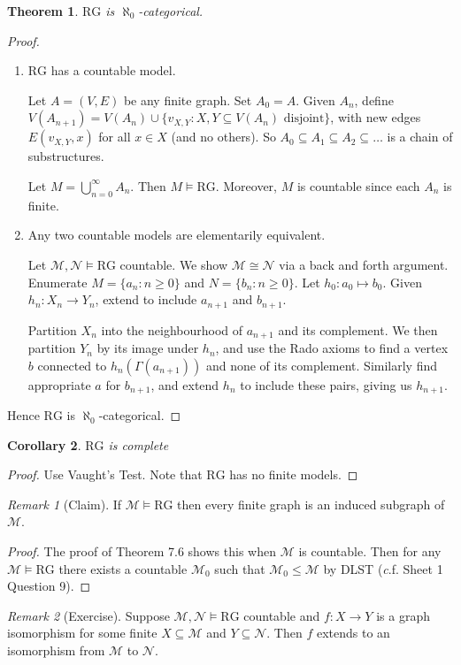 \documentclass[]{article}
\theoremstyle{custhm}
\newtheorem{theorem}{Theorem}[section]
\theoremstyle{cusdef}
\theoremstyle{custhm}
\theoremstyle{custhm}
\newtheorem{cor}[theorem]{Corollary}
\theoremstyle{custhm}
\theoremstyle{ex}
\theoremstyle{custhm}
\theoremstyle{cusdef}
\theoremstyle{remark}
\newtheorem*{remark*}{Remark}
\theoremstyle{remark}
\theoremstyle{numremark}
\newcommand{\ra}{\rightarrow}
\renewcommand{\it}[1]{\textit{#1}}
\newcommand{\M}{\mathcal{M}}
\newcommand{\N}{\mathcal{N}}
\newcommand{\rg}{\textrm{RG}}
\renewcommand{\subset}{\subseteq}
\begin{document}
\begin{theorem}
$\rg$ is $\aleph_0$-categorical.
\end{theorem}
\begin{proof}\ 
\begin{enumerate}[label=\arabic*)]
	\item $\rg$ has a countable model.
	
	Let $A = (V,E)$ be any finite graph. Set $A_0 = A$. Given $A_n$, define $V(A_{n+1}) = V(A_n)\cup\{v_{X,Y}:X,Y\subset V(A_n)\textrm{ disjoint}\}$, with new edges $E(v_{X,Y},x)$ for all $x\in X$ (and no others). So $A_0\subset A_1\subset A_2\subset\dots$ is a chain of substructures.
	
	Let $M = \bigcup_{n=0}^{\infty}A_n$. Then $M\models\rg$. Moreover, $M$ is countable since each $A_n$ is finite. 
	
	\item Any two countable models are elementarily equivalent.
	
	Let $\M,\N\models \rg$ countable. We show $\M\cong \N$ via a back and forth argument. Enumerate $M = \{a_n : n\ge 0\}$ and $N = \{b_n:n\ge 0\}$. Let $h_0: a_0\mapsto b_0$. Given $h_n:X_n\ra Y_n$, extend to include $a_{n+1}$ and $b_{n+1}$.
	
	Partition $X_n$ into the neighbourhood of $a_{n+1}$ and its complement. We then partition $Y_n$ by its image under $h_n$, and use the Rado axioms to find a vertex $b$ connected to $h_n(\Gamma(a_{n+1}))$ and none of its complement. Similarly find appropriate $a$ for $b_{n+1}$, and extend $h_n$ to include these pairs, giving us $h_{n+1}$.
\end{enumerate}
Hence $\rg$ is $\aleph_0$-categorical.
\end{proof}
\begin{cor}
$\rg$ is complete
\end{cor}
\begin{proof}
Use Vaught's Test. Note that $\rg$ has no finite models.
\end{proof}
\begin{remark*}[Claim]
If $\M\models \rg$ then every finite graph is an induced subgraph of $\M$.
\end{remark*}
\begin{proof}
The proof of Theorem 7.6 shows this when $\M$ is countable. Then for any $\M\models \rg$ there exists a countable $\M_0$ such that $\M_0\le \M$ by DLST ({\it c.f.} Sheet 1 Question 9).
\end{proof}
\begin{remark*}[Exercise]
	Suppose $\M,\N\models\rg$ countable and $f: X\ra Y$ is a graph isomorphism for some finite $X\subset \M$ and $Y\subset \N$. Then $f$ extends to an isomorphism from $\M$ to $\N$.
\end{remark*}
\end{document}

